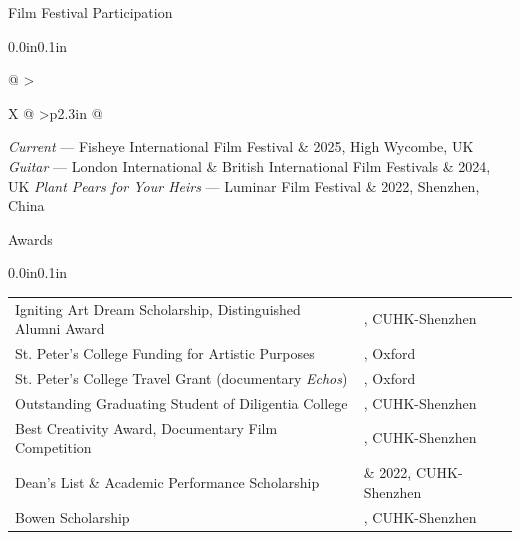 \documentclass{resume} %
\makeatletter
\newcommand{\entry}[2]{#1 & #2 \tabularnewline}
\newcommand{\tableEnv}[2]{%
  \begin{rSection}{#1}
    \begin{adjustwidth}{0.0in}{0.1in}
      \begin{tabularx}{\linewidth}{@{} >{\raggedright\arraybackslash}X @{\hspace{3ex}} >{\raggedleft\arraybackslash}p{2.3in} @{}}
        #2
      \end{tabularx}
    \end{adjustwidth}
  \end{rSection}
}
\makeatother
\begin{document}
\tableEnv{Film Festival Participation}{
    \entry{\textit{Current} --- Fisheye International Film Festival}{2025, High Wycombe, UK}
    \entry{\textit{Guitar} --- London International \& British International Film Festivals}{2024, UK}
    \entry{\textit{Plant Pears for Your Heirs} --- Luminar Film Festival}{2022, Shenzhen, China}
}

\tableEnv{Awards}{
    \entry{Igniting Art Dream Scholarship, Distinguished Alumni Award}{2025, CUHK-Shenzhen}
    \entry{St. Peter's College Funding for Artistic Purposes}{2025, Oxford}
    \entry{St. Peter's College Travel Grant (documentary \textit{Echos})}{2025, Oxford}
    \entry{Outstanding Graduating Student of Diligentia College}{2024, CUHK-Shenzhen}
    \entry{Best Creativity Award, Documentary Film Competition}{2022, CUHK-Shenzhen}
    \entry{Dean's List \& Academic Performance Scholarship}{2021 \& 2022, CUHK-Shenzhen}
    \entry{Bowen Scholarship}{2020, CUHK-Shenzhen}
}

\end{document}
